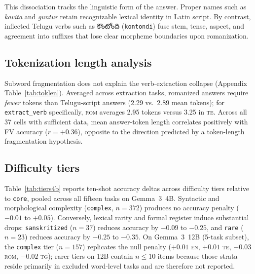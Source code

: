 \documentclass[11pt]{article}
\newcommand{\telugufont}{}
\newcommand{\tel}[1]{{\telugufont #1}}
\newcommand{\cond}[1]{\textsc{#1}}
\begin{document}
This dissociation tracks the linguistic form of the answer. Proper names such
as \emph{kavita} and \emph{guntur} retain recognizable lexical identity in
Latin script. By contrast, inflected Telugu verbs such as \tel{కొంటోంది}
(\texttt{kontondi}) fuse stem, tense, aspect, and agreement into suffixes that
lose clear morpheme boundaries upon romanization.

\subsection{Tokenization length analysis}
\label{sec:tokens}

Subword fragmentation does not explain the verb-extraction collapse (Appendix
Table~\ref{tab:toklen}). Averaged across extraction tasks, romanized answers
require \emph{fewer} tokens than Telugu-script answers (2.29 vs.\ 2.89 mean
tokens); for \texttt{extract\_verb} specifically, \cond{rom} averages 2.95
tokens versus 3.25 in \cond{te}. Across all 37 cells with sufficient data,
mean answer-token length correlates positively with FV accuracy ($r = +0.36$),
opposite to the direction predicted by a token-length fragmentation hypothesis.

\subsection{Difficulty tiers}
\label{sec:tiers}

Table~\ref{tab:tiers4b} reports ten-shot accuracy deltas across difficulty
tiers relative to \texttt{core}, pooled across all fifteen tasks on
Gemma~3~4B. Syntactic and morphological complexity (\texttt{complex}, $n=372$)
produces no accuracy penalty ($-0.01$ to $+0.05$). Conversely, lexical rarity
and formal register induce substantial drops: \texttt{sanskritized} ($n=37$)
reduces accuracy by $-0.09$ to $-0.25$, and \texttt{rare} ($n=23$) reduces
accuracy by $-0.25$ to $-0.35$. On Gemma~3~12B (5-task subset), the
\texttt{complex} tier ($n=157$) replicates the null penalty ($+0.01$ \cond{en},
$+0.01$ \cond{te}, $+0.03$ \cond{rom}, $-0.02$ \cond{tg}); rarer tiers on 12B
contain $n \le 10$ items because those strata reside primarily in excluded
word-level tasks and are therefore not reported.

\begin{table}[t]
\centering
\small
\caption{Ten-shot accuracy by difficulty tier relative to \texttt{core}, pooled
  across all 15 tasks (Gemma~3~4B).}
\label{tab:tiers4b}
\end{table}
\end{document}
